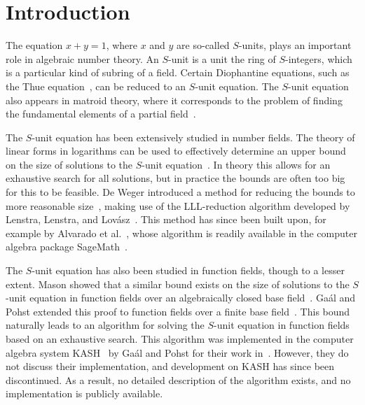 
\chapter{Introduction}%
\label{chap:introduction}

The equation \(x + y = 1\), where \(x\) and \(y\) are so-called \(S\)-units, plays an important role in algebraic number theory. An \(S\)-unit is a unit the ring of \(S\)-integers, which is a particular kind of subring of a field. Certain Diophantine equations, such as the Thue equation~\cite{thue-1909-uber-annaherungsweerte-algebraischer}, can be reduced to an \(S\)-unit equation. The \(S\)-unit equation also appears in matroid theory, where it corresponds to the problem of finding the fundamental elements of a partial field~\cite{zwam-2009-partial-fields-in}.

The \(S\)-unit equation has been extensively studied in number fields. The theory of linear forms in logarithms can be used to effectively determine an upper bound on the size of solutions to the \(S\)-unit equation~\cite{gyory-1979-on-the-number}. In theory this allows for an exhaustive search for all solutions, but in practice the bounds are often too big for this to be feasible. De Weger introduced a method for reducing the bounds to more reasonable size~\cite{weger-1989-algorithms-for-diophantine}, making use of the LLL-reduction algorithm developed by Lenstra, Lenstra, and Lov\'{a}sz~\cite{lenstra-1982-factoring-polynomials-with}. This method has since been built upon, for example by Alvarado et al.~\cite{alvarado-2021-a-robust-implementation}, whose algorithm is readily available in the computer algebra package SageMath~\cite{sagemath}.

The \(S\)-unit equation has also been studied in function fields, though to a lesser extent. Mason showed that a similar bound exists on the size of solutions to the \(S\)-unit equation in function fields over an algebraically closed base field~\cite{mason-1984-diophantine-equations-over}. Ga\'{a}l and Pohst extended this proof to function fields over a finite base field~\cite{gaal-2006-diophantine-equations-over}. This bound naturally leads to an algorithm for solving the \(S\)-unit equation in function fields based on an exhaustive search. This algorithm was implemented in the computer algebra system KASH~\cite{daberkow-1997-kant-v4} by Ga\'{a}l and Pohst for their work in~\cite{gaal-2006-diophantine-equations-over}. However, they do not discuss their implementation, and development on KASH has since been discontinued. As a result, no detailed description of the algorithm exists, and no implementation is publicly available.

